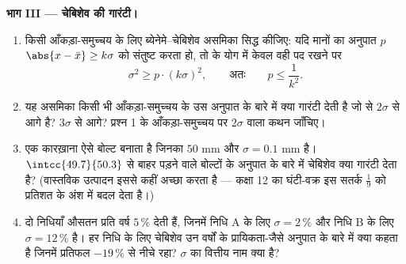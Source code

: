 \begin{problem}
\medskip
\noindent\textbf{भाग III --- चेबिशेव की गारंटी।}
\begin{enumerate}[resume]
  \item किसी आँकड़ा-समुच्चय के लिए ब्येनेमे--चेबिशेव असमिका सिद्ध कीजिए: यदि
        मानों का अनुपात $p$ $\abs{x - \bar x} \geq k\sigma$ को संतुष्ट करता हो, तो  के योग
        में केवल वही पद रखने पर
        \[
        \sigma^2 \geq p \cdot (k\sigma)^2,
        \qquad\text{अतः}\qquad
        p \leq \frac{1}{k^2} .
        \]
  \item यह असमिका किसी भी आँकड़ा-समुच्चय के उस अनुपात के बारे में क्या
        गारंटी देती है जो  से $2\sigma$ से आगे है? $3\sigma$ से आगे? प्रश्न 1
        के आँकड़ा-समुच्चय पर $2\sigma$ वाला कथन जाँचिए।
  \item एक कारख़ाना ऐसे बोल्ट बनाता है जिनका  $50$ mm और $\sigma = 0.1$ mm है।
        $\intcc{49.7}{50.3}$ से बाहर पड़ने वाले बोल्टों के अनुपात के बारे में चेबिशेव क्या
        गारंटी देता है? (वास्तविक उत्पादन इससे कहीं अच्छा करता है --- कक्षा
        12 का घंटी-वक्र इस सतर्क $\frac19$ को प्रतिशत के अंश में बदल देता है।)
  \item दो निधियाँ औसतन प्रति वर्ष $5\,\%$ देती हैं, जिनमें निधि A के लिए
        $\sigma = 2\,\%$ और निधि B के लिए $\sigma = 12\,\%$ है। हर निधि के लिए चेबिशेव उन वर्षों के
        प्रायिकता-जैसे अनुपात के बारे में क्या कहता है जिनमें प्रतिफल $-19\,\%$
        से नीचे रहा? $\sigma$ का वित्तीय नाम क्या है?
\end{enumerate}


\end{problem}
